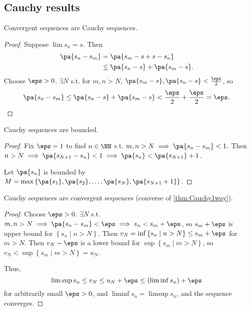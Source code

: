 \documentclass[11pt]{scrartcl}
\numberwithin{equation}{section}
\begin{document}
\subsection{Cauchy results}

\begin{theorem}
    \label{thm:Cauchy1way}
    Convergent sequences are Cauchy sequences.
\end{theorem}

\begin{proof}
    Suppose $\lim s_n=s$. Then 
    \begin{align*}
        \pa{s_n-s_m} &= \pa{s_m-s+s-s_n} \\
        &\leq \pa{s_n-s} + \pa{s_m-s}.
    \end{align*}
    Choose $\eps >0$. $\exists N$ s.t. for $m,n>N$, $\pa{s_m-s},\pa{s_n-s}<\frac{\eps}{2}$,
    so \[ \pa{s_n-s_m} \leq \pa{s_n-s} + \pa{s_m-s} < \frac{\eps}{2} + \frac{\eps}{2} = \eps. \qedhere\]
\end{proof}

\begin{theorem}
    \label{thm:cauchybdd}
    Cauchy sequences are bounded.
\end{theorem}
\begin{proof}
    Fix $\eps=1$ to find $n \in \NN$ s.t. 
    $m,n > N\implies \pa{s_n-s_m}<1.$ Then $n>N \implies \pa{s_{N+1}-s_n}<1 \implies \pa{s_n} < \pa{s_{N+1}} + 1$.
    
    Let $\pa{s_n}$ is bounded by 
    $M = \max \left\{\pa{s_1},\pa{s_2},\dots,\pa{s_N}, \pa{s_{N+1}+1}\right\}$. 
\end{proof}
\begin{theorem}
    \label{thm:cauchyconv}
    Cauchy sequences are convergent sequences (converse of \cref{thm:Cauchy1way}).
\end{theorem}
\begin{proof}
    Choose $\eps>0$. $\exists N$ s.t. $m,n>N\implies \pa{s_n-s_m}<\eps\implies s_n<s_m +\eps$, so 
    $s_m + \eps$ is upper bound for $\left\{s_n\mid n>N\right\}$.
    Then $v_N = \inf \left\{s_n\mid n>N\right\} \leq s_m+\eps$ for $m > N$.
    Then $v_N-\eps$ is a lower bound for $\sup\left\{s_m\mid m>N\right\}$,
    so $v_N < \sup \left\{s_m\mid m>N\right\} = u_N$.

    Thus,
    \[ \limsup s_n \leq v_N \leq u_N + \eps \leq (\liminf s_n) + \eps \]
    for arbitrarily small $\eps>0$, and $\liminf s_n = \limsup s_n$,
    and the sequence converges.
\end{proof}
\end{document}

